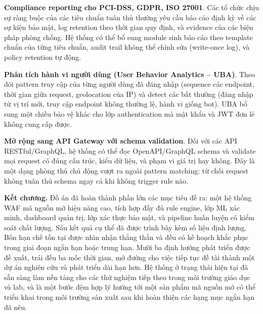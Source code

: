 \documentclass[../DoAn.tex]{subfiles}
\begin{document}
\textbf{Compliance reporting cho PCI-DSS, GDPR, ISO 27001}. Các tổ chức
chịu sự ràng buộc của các tiêu chuẩn tuân thủ thường yêu cầu báo cáo
định kỳ về các sự kiện bảo mật, log retention theo thời gian quy định,
và evidence của các biện pháp phòng chống. Hệ thống có thể bổ sung module
sinh báo cáo theo template chuẩn của từng tiêu chuẩn, audit trail không
thể chỉnh sửa (write-once log), và policy retention tự động.

\textbf{Phân tích hành vi người dùng (User Behavior Analytics -- UBA)}.
Theo dõi pattern truy cập của từng người dùng đã đăng nhập (sequence các
endpoint, thời gian giữa request, geolocation của IP) và detect các bất
thường (đăng nhập từ vị trí mới, truy cập endpoint không thường lệ, hành
vi giống bot). UBA bổ sung một chiều bảo vệ khác cho lớp authentication
mà mật khẩu và JWT đơn lẻ không cung cấp được.

\textbf{Mở rộng sang API Gateway với schema validation}. Đối với các API
RESTful/GraphQL, hệ thống có thể đọc OpenAPI/GraphQL schema và validate
mọi request có đúng cấu trúc, kiểu dữ liệu, và phạm vi giá trị hay không.
Đây là một dạng phòng thủ chủ động vượt ra ngoài pattern matching: từ
chối request không tuân thủ schema ngay cả khi không trigger rule nào.

\bigskip
\noindent\textbf{Kết chương.}
Đồ án đã hoàn thành phần lớn các mục tiêu đề ra: một hệ thống WAF mã nguồn
mở hiệu năng cao, tích hợp đầy đủ rule engine, lớp ML xác minh, dashboard
quản trị, lớp xác thực bảo mật, và pipeline huấn luyện có kiểm soát chất
lượng. Sáu kết quả cụ thể đã được trình bày kèm số liệu định lượng. Bốn
hạn chế tồn tại được nhìn nhận thẳng thắn và đều có kế hoạch khắc phục
trong giai đoạn ngắn hạn hoặc trung hạn. Mười ba định hướng phát triển
được đề xuất, trải đều ba mốc thời gian, mở đường cho việc tiếp tục đề
tài thành một dự án nghiên cứu và phát triển dài hạn hơn. Hệ thống ở trạng
thái hiện tại đã sẵn sàng làm nền tảng cho các thử nghiệm tiếp theo trong
môi trường giáo dục và lab, và là một bước đệm hợp lý hướng tới một sản
phẩm mã nguồn mở có thể triển khai trong môi trường sản xuất sau khi hoàn
thiện các hạng mục ngắn hạn đã nêu.
\end{document}
